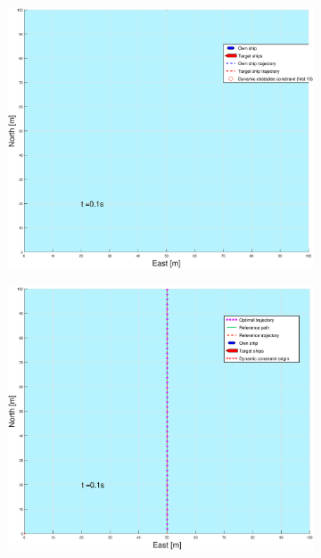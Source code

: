 \begin{figure}[!b] %
    \begin{subfigure}[b]{0.49\textwidth}
        \centering
        \includegraphics[width=\textwidth]{Images/Figures/enkel_HO/_Simple_1fig1_time=0}
    \end{subfigure}
    \hfill
    \begin{subfigure}[b]{0.499\textwidth}
        \centering
        \includegraphics[width=\textwidth]{Images/Figures/enkel_HO/_Simple_1fig999_time=0}

\end{subfigure}
\end{figure}
